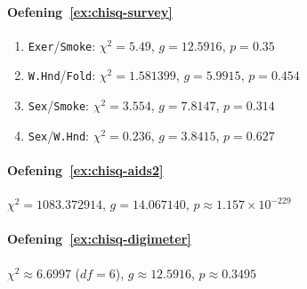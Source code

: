 \paragraph{Oefening~\ref{ex:chisq-survey}}

\begin{enumerate}
  \item \texttt{Exer}/\texttt{Smoke}: $\chi^2 = 5.49$, $g = 12.5916$, $p = 0.35$
  \item \texttt{W.Hnd}/\texttt{Fold}: $\chi^2 = 1.581399$, $g = 5.9915$, $p = 0.454$
  \item \texttt{Sex}/\texttt{Smoke}: $\chi^2 = 3.554$, $g = 7.8147$, $p = 0.314$
  \item \texttt{Sex}/\texttt{W.Hnd}: $\chi^2 = 0.236$, $g = 3.8415$, $p = 0.627$
\end{enumerate}

\paragraph{Oefening~\ref{ex:chisq-aids2}} $\chi^2 = 1083.372914$, $g = 14.067140$, $p \approx 1.157 \times 10^{-229}$

\paragraph{Oefening~\ref{ex:chisq-digimeter}} $\chi^2 \approx 6.6997$ ($df = 6$), $g \approx 12.5916$, $p \approx 0.3495$
